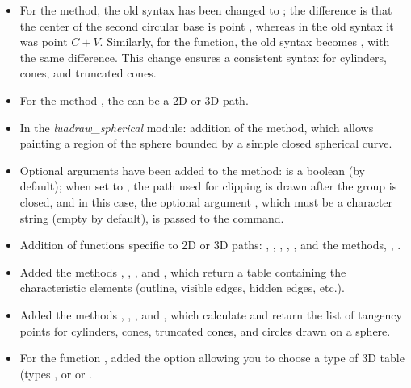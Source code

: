\begin{itemize}
    \item For the  method, the old syntax  has been changed to ; the difference is that the center of the second circular base is point , whereas in the old syntax it was point $C+V$. Similarly, for the  function, the old syntax  becomes , with the same difference. This change ensures a consistent syntax for cylinders, cones, and truncated cones.
    
    \item For the method , the  can be a 2D or 3D path.

    \item In the \emph{luadraw\_spherical} module: addition of the  method, which allows painting a region of the sphere bounded by a simple closed spherical curve.

    \item Optional arguments have been added to the  method:  is a boolean (\false by default); when set to \true, the path used for clipping is drawn after the group is closed, and in this case, the optional argument , which must be a character string (empty by default), is passed to the \drawcmd command.

    \item Addition of functions specific to 2D or 3D paths: , , , , , and the methods, , .
    
    \item Added the methods , , , and , which return a table containing the characteristic elements (outline, visible edges, hidden edges, etc.).
    
    \item Added the methods , , , and , which calculate and return the list of tangency points for cylinders, cones, truncated cones, and circles drawn on a sphere.
    
    \item For the function , added the option  allowing you to choose a type of 3D table (types , or  or .


\end{itemize}
